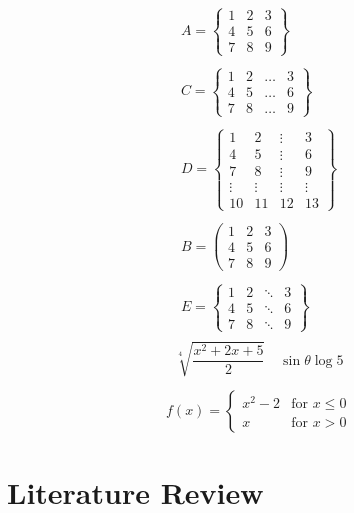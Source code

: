 \documentclass[12pt]{report} %
\begin{document}
    \begin{eqnarray} 
    A = \begin{Bmatrix}
        1 & 2 & 3\\
        4 & 5 & 6 \\
        7 & 8 & 9
    \end{Bmatrix}\\
    \\
    C = \begin{Bmatrix}
        1 & 2 &\hdots &3\\
        4 & 5 &\hdots & 6 \\
        7 & 8 &\hdots & 9
    \end{Bmatrix}\\
    \\
    D = \begin{Bmatrix}
        1 & 2 &\vdots &3\\
        4 & 5 &\vdots & 6 \\
        7 & 8 &\vdots & 9\\
        \vdots & \vdots &\vdots & \vdots\\
        10 & 11 & 12 & 13
    \end{Bmatrix}\\
    \\
    B = \begin{pmatrix}
        1 & 2 & 3 \\
        4 & 5 & 6 \\
        7 & 8 & 9
    \end{pmatrix}\\
    \\
    E = \begin{Bmatrix}
        1 & 2 &\ddots &3\\
        4 & 5 &\ddots & 6 \\
        7 & 8 &\ddots & 9
    \end{Bmatrix}\\
    \end{eqnarray}
     \[\sqrt[4]{\dfrac{x^2+2x+5}{2}}\quad \sin \theta \log5\]
   
    \begin{equation}
        f(x) =  \begin{cases}
            x^2-2 & \text{for } x \leq 0 \\
            x & \text{for } x > 0
        \end{cases}
    \end{equation}
\chapter{Literature Review}
\end{document}
